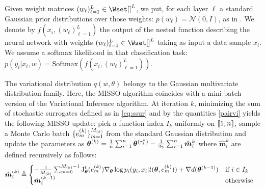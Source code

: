 \documentclass[11pt]{article}
\theoremstyle{t}
\begin{document}
Given weight matrices $(w_\ell)_{\ell=1}^L \in \Wset[]^L$, we put, for each layer $\ell$ a standard Gaussian prior distributions over those weights: $p(w_\ell) = \mathcal{N}(0,I)$, as in \citep{gal2015bayesian}.
We denote by $f(x_i,(w_\ell)_{\ell=1}^L)$ the output of the nested function describing the neural network with weights $(w_\ell)_{\ell=1}^L \in \Wset[]^L$ taking as input a data sample $x_i$.
We assume a softmax likelihood in that classification task: $p(y_i|x_i,w) = \textrm{Softmax}(f(x_i,(w_\ell)_{\ell=1}^L))$.

The variational distribution $q(w,\theta)$ belongs to the Gaussian multivariate distribution family.
Here, the MISSO algorithm coincides with a mini-batch version of the Variational Inference algorithm. At iteration $k$, minimizing the sum of stochastic surrogates defined as in \eqref{eq:ssur} and by the quantities \eqref{pairvi} yields the following MISSO update: pick a function index $I_k$ uniformly on $\inter$, sample a Monte Carlo batch $ \{ e_{m}^{(k)} \}_{m=1}^{\Bsize{k}}$ from the standard Gaussian distribution and update the parameters as $\hp{k} = \frac{1}{n}\sum_{i=1}^{n}{\hp{\tau_{i}^{k}}} - \frac{1}{2 \gamma} \sum_{i=1}^{n}{\hat{{\bm{m}}}^k_i}$ where $\hat{{\bm{m}}}^k_i$ are defined recursively as follows:
\begin{align}\label{missoupdate}
 \hat{{\bm{m}}}^{(k)}_i &\triangleq
  \begin{cases}
  - \frac{1}{\Bsize{k}}\sum_{m=0}^{\Bsize{k}-1}{ \jacob{\param}{t}{e_{m}^{(k)}}\nabla_{\param} \log p_i(y_i,x_i|t(\param,e_{m}^{(k)}))} + \nabla d(\hp{k-1})     & \text{if } i \in I_k \\
  \hat{{\bm{m}}}^{(k-1)}_{i}         & \text{otherwise}
  \end{cases}
\end{align}

\end{document}
